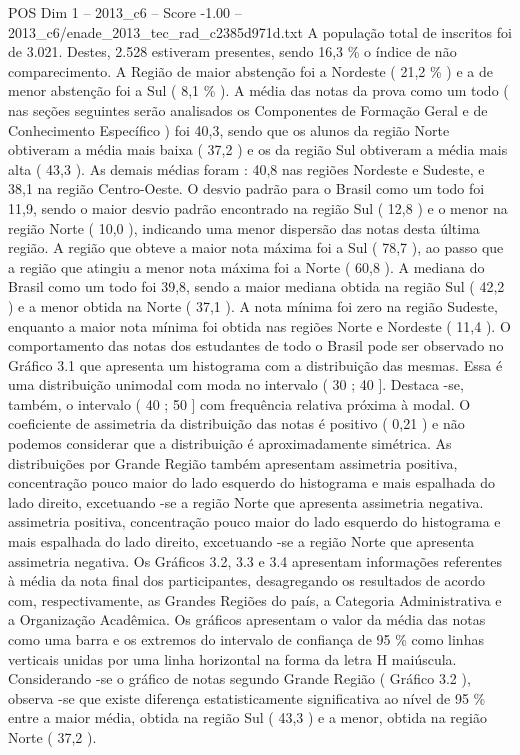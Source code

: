 \begin{textsample}{POS Dim 1 – 2013\_c6 – Score -1.00 – 2013\_c6/enade\_2013\_tec\_rad\_c2385d971d.txt}
A população total de inscritos foi de 3.021.
Destes, 2.528 estiveram presentes, sendo 16,3 \% o índice de não comparecimento.
A Região de maior abstenção foi a Nordeste ( 21,2 \% ) e a de menor abstenção foi a Sul ( 8,1 \% ).
A média das notas da prova como um todo ( nas seções seguintes serão analisados os Componentes de Formação Geral e de Conhecimento Específico ) foi 40,3, sendo que os alunos da região Norte obtiveram a média mais baixa ( 37,2 ) e os da região Sul obtiveram a média mais alta ( 43,3 ).
As demais médias foram : 40,8 nas regiões Nordeste e Sudeste, e 38,1 na região Centro-Oeste.
O desvio padrão para o Brasil como um todo foi 11,9, sendo o maior desvio padrão encontrado na região Sul ( 12,8 ) e o menor na região Norte ( 10,0 ), indicando uma menor dispersão das notas desta última região.
A região que obteve a maior nota máxima foi a Sul ( 78,7 ), ao passo que a região que atingiu a menor nota máxima foi a Norte ( 60,8 ).
A mediana do Brasil como um todo foi 39,8, sendo a maior mediana obtida na região Sul ( 42,2 ) e a menor obtida na Norte ( 37,1 ).
A nota mínima foi zero na região Sudeste, enquanto a maior nota mínima foi obtida nas regiões Norte e Nordeste ( 11,4 ).
O comportamento das notas dos estudantes de todo o Brasil pode ser observado no Gráfico 3.1 que apresenta um histograma com a distribuição das mesmas.
Essa é uma distribuição unimodal com moda no intervalo ( 30 ; 40 ].
Destaca -se, também, o intervalo ( 40 ; 50 ] com frequência relativa próxima à modal.
O coeficiente de assimetria da distribuição das notas é positivo ( 0,21 ) e não podemos considerar que a distribuição é aproximadamente simétrica.
As distribuições por Grande Região também apresentam assimetria positiva, concentração pouco maior do lado esquerdo do histograma e mais espalhada do lado direito, excetuando -se a região Norte que apresenta assimetria negativa. assimetria positiva, concentração pouco maior do lado esquerdo do histograma e mais espalhada do lado direito, excetuando -se a região Norte que apresenta assimetria negativa.
Os Gráficos 3.2, 3.3 e 3.4 apresentam informações referentes à média da nota final dos participantes, desagregando os resultados de acordo com, respectivamente, as Grandes Regiões do país, a Categoria Administrativa e a Organização Acadêmica.
Os gráficos apresentam o valor da média das notas como uma barra e os extremos do intervalo de confiança de 95 \% como linhas verticais unidas por uma linha horizontal na forma da letra H maiúscula.
Considerando -se o gráfico de notas segundo Grande Região ( Gráfico 3.2 ), observa -se que existe diferença estatisticamente significativa ao nível de 95 \% entre a maior média, obtida na região Sul ( 43,3 ) e a menor, obtida na região Norte ( 37,2 ).

\end{textsample}
